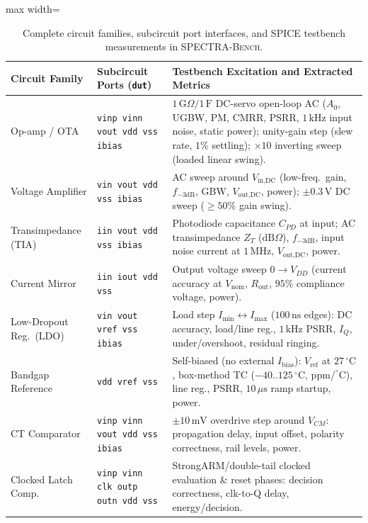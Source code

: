 \begin{table}[ht]
\centering
\caption{Complete circuit families, subcircuit port interfaces, and SPICE testbench measurements in \textsc{SPECTRA-Bench}.}
\label{tab:supp_families}
\footnotesize
\setlength{\tabcolsep}{4.0pt}
\begin{adjustbox}{max width=\textwidth}
\begin{tabular}{@{}llp{88mm}@{}}
\toprule
Circuit Family & Subcircuit Ports (\texttt{dut}) & Testbench Excitation and Extracted Metrics \\
\midrule
Op-amp / OTA & \texttt{vinp vinn vout vdd vss ibias} & $1\,\mathrm{G}\Omega/1\,\mathrm{F}$ DC-servo open-loop AC ($A_0$, UGBW, PM, CMRR, PSRR, $1\,\mathrm{kHz}$ input noise, static power); unity-gain step (slew rate, $1\%$ settling); $\times 10$ inverting sweep (loaded linear swing). \\
Voltage Amplifier & \texttt{vin vout vdd vss ibias} & AC sweep around $V_{\text{in,DC}}$ (low-freq.\ gain, $f_{-3\mathrm{dB}}$, GBW, $V_{\text{out,DC}}$, power); $\pm 0.3\,\mathrm{V}$ DC sweep ($\ge 50\%$ gain swing). \\
Transimpedance (TIA) & \texttt{iin vout vdd vss ibias} & Photodiode capacitance $C_{PD}$ at input; AC transimpedance $Z_T$ ($\mathrm{dB}\Omega$), $f_{-3\mathrm{dB}}$, input noise current at $1\,\mathrm{MHz}$, $V_{\text{out,DC}}$, power. \\
Current Mirror & \texttt{iin iout vdd vss} & Output voltage sweep $0 \to V_{DD}$ (current accuracy at $V_{\text{nom}}$, $R_{\text{out}}$, $95\%$ compliance voltage, power). \\
Low-Dropout Reg.\ (LDO) & \texttt{vin vout vref vss ibias} & Load step $I_{\min} \leftrightarrow I_{\max}$ ($100\,\mathrm{ns}$ edges): DC accuracy, load/line reg., $1\,\mathrm{kHz}$ PSRR, $I_Q$, under/overshoot, residual ringing. \\
Bandgap Reference & \texttt{vdd vref vss} & Self-biased (no external $I_{\text{bias}}$): $V_{\text{ref}}$ at $27\,^\circ\mathrm{C}$, box-method TC ($-40..125\,^\circ\mathrm{C}$, $\mathrm{ppm}/^\circ\mathrm{C}$), line reg., PSRR, $10\,\mu\mathrm{s}$ ramp startup, power. \\
CT Comparator & \texttt{vinp vinn vout vdd vss ibias} & $\pm 10\,\mathrm{mV}$ overdrive step around $V_{CM}$: propagation delay, input offset, polarity correctness, rail levels, power. \\
Clocked Latch Comp. & \texttt{vinp vinn clk outp outn vdd vss} & StrongARM/double-tail clocked evaluation \& reset phases: decision correctness, clk-to-Q delay, energy/decision. \\

\end{tabular}
\end{adjustbox}
\end{table}
